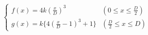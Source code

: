 \documentclass[
  11pt,
  border=2,
  convert={
    density=150 -alpha off,
    outext=.png
  },
]{standalone}
\begin{document}
$
  \begin{cases}
    \displaystyle f(x) = 4k(\frac{x}{D})^{3} & (0 \leq x \leq \frac{D}{2})
    \\
    \displaystyle g(x) = k\{4(\frac{x}{D} - 1)^{3} + 1\} & (\frac{D}{2} \leq x \leq D)
  \end{cases}
$
\end{document}
